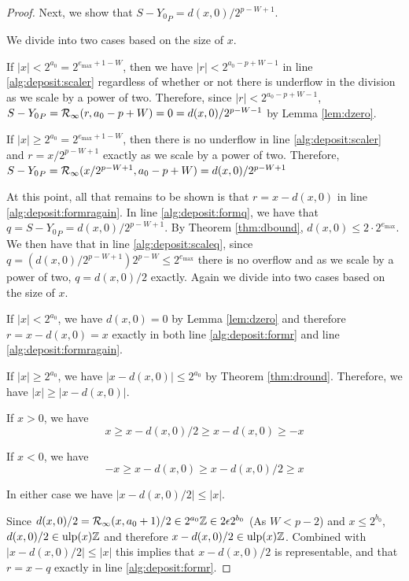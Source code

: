 \begin{proof}
        Next, we show that $S - {Y_0}_P = d(x, 0)/2^{p - W + 1}$.

        We divide into two cases based on the size of $x$.

        If $|x| < 2^{a_0} = 2^{e_{\max} + 1 - W}$, then we have $|r| < 2^{a_0 - p + W - 1}$ in line \ref{alg:deposit:scaler} regardless of whether or not there is underflow in the division as we scale by a power of two.
         Therefore, since $|r| < 2^{a_0 - p + W - 1}$, $S - {Y_0}_P = \mathcal{R}_\text{$\infty$}(r, a_0 - p + W) = 0 = d(x, 0)/2^{p - W - 1}$ by Lemma \ref{lem:dzero}.

        If $|x| \geq 2^{a_0}= 2^{e_{\max} + 1 - W}$, then there is no underflow in line \ref{alg:deposit:scaler} and $r = x / 2^{p - W + 1}$ exactly as we scale by a power of two. Therefore, $S - {Y_0}_P = \mathcal{R}_\text{$\infty$}(x/2^{p - W + 1}, a_0 - p + W) = d(x, 0)/2^{p - W + 1}$

        At this point, all that remains to be shown is that $r = x - d(x, 0)$ in line \ref{alg:deposit:formragain}. In line \ref{alg:deposit:formq}, we have that $q = S - {Y_0}_P = d(x, 0)/2^{p - W + 1}$. By Theorem \ref{thm:dbound}, $d(x, 0) \leq 2 \cdot 2^{e_{\max}}$. We then have that in line \ref{alg:deposit:scaleq}, since $q = (d(x, 0)/2^{p - W + 1})2^{p - W} \leq 2^{e_{\max}}$ there is no overflow and as we scale by a power of two, $q = d(x, 0)/2$ exactly. Again we divide into two cases based on the size of $x$.

        If $|x| < 2^{a_0}$, we have $d(x, 0) = 0$ by Lemma \ref{lem:dzero} and therefore $r = x - d(x, 0) = x$ exactly in both line \ref{alg:deposit:formr} and line \ref{alg:deposit:formragain}.

        If $|x| \geq 2^{a_0}$, we have $|x - d(x, 0)| \leq 2^{a_0}$ by Theorem \ref{thm:dround}. Therefore, we have $|x| \geq |x - d(x, 0)|$. 

        If $x > 0$, we have
        \begin{equation*}
          x \geq x - d(x, 0)/2 \geq x - d(x, 0) \geq -x
        \end{equation*}

         If $x < 0$, we have
        \begin{equation*}
          -x \geq x - d(x, 0) \geq x - d(x, 0)/2 \geq x
        \end{equation*}

        In either case we have $|x - d(x, 0)/2| \leq |x|$.

        Since $d(x, 0)/2 = \mathcal{R}_\text{$\infty$}(x, a_0 + 1)/2 \in 2^{a_0}\mathbb{Z} \in 2  \epsilon  2^{b_0}$ (As $W < p - 2$) and $x \leq 2^{b_0}$, $d(x, 0)/2 \in \text{ulp}(x)\mathbb{Z}$ and therefore $x - d(x, 0)/2 \in \text{ulp}(x)\mathbb{Z}$. Combined with $|x - d(x, 0)/2| \leq |x|$ this implies that $x - d(x, 0)/2$ is representable, and that $r=x-q$ exactly in line \ref{alg:deposit:formr}.


\end{proof}

